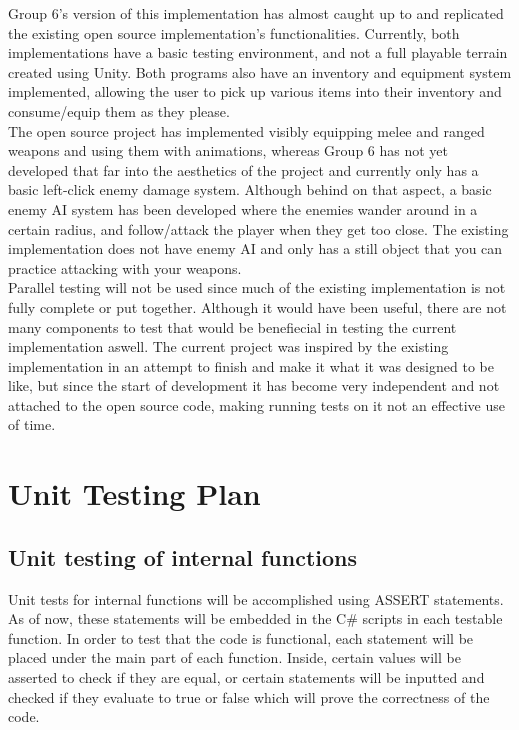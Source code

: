 \documentclass[12pt, titlepage]{article}
\begin{document}
Group 6's version of this implementation has almost caught up to and replicated the existing open source implementation's functionalities. Currently, both implementations have a basic testing environment, and not a full playable terrain created using Unity. Both programs also have an inventory and equipment system implemented, allowing the user to pick up various items into their inventory and consume/equip them as they please. \\

The open source project has implemented visibly equipping melee and ranged weapons and using them with animations, whereas Group 6 has not yet developed that far into the aesthetics of the project and currently only has a basic left-click enemy damage system. Although behind on that aspect, a basic enemy AI system has been developed where the enemies wander around in a certain radius, and follow/attack the player when they get too close.  The existing implementation does not have enemy AI and only has a still object that you can practice attacking with your weapons. \\

Parallel testing will not be used since much of the existing implementation is not fully complete or put together. Although it would have been useful, there are not many components to test that would be benefiecial in testing the current implementation aswell. The current project was inspired by the existing implementation in an attempt to finish and make it what it was designed to be like, but since the start of development it has become very independent and not attached to the open source code, making running tests on it not an effective use of time.


\section{Unit Testing Plan}

\subsection{Unit testing of internal functions}

Unit tests for internal functions will be accomplished using ASSERT statements. As of now, these statements will be embedded in the C\# scripts in each testable function. In order to test that the code is functional, each statement will be placed under the main part of each function. Inside, certain values will be asserted to check if they are equal, or certain statements will be inputted and checked if they evaluate to true or false which will prove the correctness of the code.   \\
\end{document}

